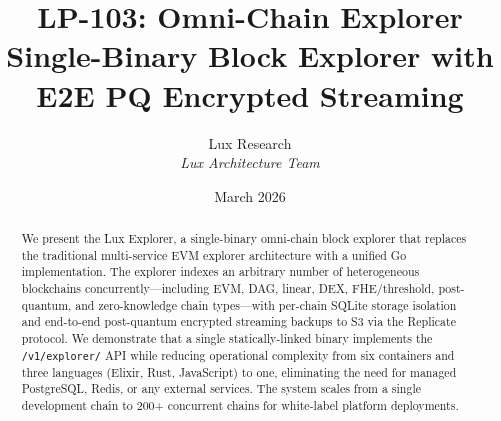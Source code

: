 \documentclass[11pt,a4paper]{article}
\title{LP-103: Omni-Chain Explorer\\Single-Binary Block Explorer with E2E PQ Encrypted Streaming}
\author{Lux Research \\
\textit{Lux Architecture Team}}
\date{March 2026}
\begin{document}
\luxcoverpage

\maketitle

\begin{abstract}
We present the Lux Explorer, a single-binary omni-chain block explorer that replaces the
traditional multi-service EVM explorer architecture with a unified Go implementation. The
explorer indexes an arbitrary number of heterogeneous blockchains concurrently---including
EVM, DAG, linear, DEX, FHE/threshold, post-quantum, and zero-knowledge chain types---with
per-chain SQLite storage isolation and end-to-end post-quantum encrypted streaming backups
to S3 via the Replicate protocol. We demonstrate that a single statically-linked binary
implements the \texttt{/v1/explorer/} API while reducing operational complexity from six
containers and three languages (Elixir, Rust, JavaScript) to one, eliminating the need for
managed PostgreSQL, Redis, or any external services. The system scales from a single
development chain to 200+ concurrent chains for white-label platform deployments.
\end{abstract}

\tableofcontents









\end{document}
